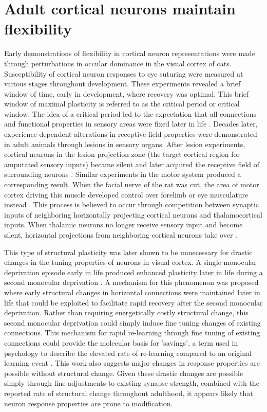 \section{Adult cortical neurons maintain flexibility}
Early demonstrations of flexibility in cortical neuron representations were made through perturbations in occular dominance in the visual cortex of cats. Susceptibility of cortical neuron responses to eye suturing were measured at various stages throughout development. These experiments revealed a brief window of time, early in development, where recovery was optimal. This brief window of maximal plasticity is referred to as the critical period or critical window. The idea of a critical period led to the expectation that all connections and functional properties in sensory areas were fixed later in life \citep{Gilbert1990}.  Decades later, experience dependent alterations in receptive field properties were demonstrated in adult animals through lesions in sensory organs. After lesion experiments, cortical neurons in the lesion projection zone (the target cortical region for amputated sensory inputs) became silent and later acquired the receptive field of surrounding neurons \citep{Merzenich1984, Robertson1989, Kaas1990}. Similar experiments in the motor system produced a corresponding result. When the facial nerve of the rat was cut, the area of motor cortex driving this muscle developed control over forelimb or eye musculature instead \citep{Gilbert1992}. This process is believed to occur through competition between synaptic inputs of neighboring horizontally projecting cortical neurons and thalamocortical inputs. When thalamic neurons no longer receive sensory input and become silent, horizontal projections from neighboring cortical neurons take over \citep{Darian-Smith1994}. 

\bigskip

This type of structural plasticity was later shown to be unnecessary for drastic changes in the tuning properties of neurons in visual cortex. A single monocular deprivation episode early in life produced enhanced plasticity later in life during a second monocular deprivation \citep{Hofer2006, Hofer2009}. A mechanism for this phenomenon was proposed where early structural changes in horizontal connections were maintained later in life that could be exploited to facilitate rapid recovery after the second monocular deprivation. Rather than requiring energetically costly structural change, this second monocular deprivation could simply induce fine tuning changes of existing connections. This mechanism for rapid re-learning through fine tuning of existing connections could provide the molecular basis for 'savings', a term used in psychology to describe the elevated rate of re-learning compared to an original learning event \citep{Ebbinghaus1880}. This work also suggests major changes in response properties are possible without structural change. Given these drastic changes are possible simply through fine adjustments to existing synapse strength, combined with the reported rate of structural change throughout adulthood, it appears likely that neuron response properties are prone to modification.


